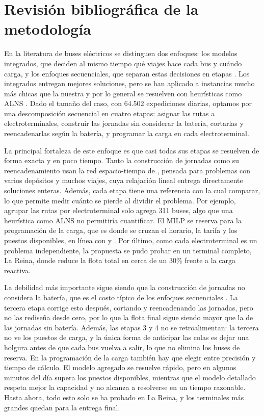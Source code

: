 \section{Revisión bibliográfica de la metodología}
 
En la literatura de buses eléctricos se distinguen dos enfoques: los modelos integrados, que deciden al mismo tiempo qué viajes hace cada bus y cuándo carga, y los enfoques secuenciales, que separan estas decisiones en etapas \cite{perumal2022}. Los integrados entregan mejores soluciones, pero se han aplicado a instancias mucho más chicas que la nuestra y por lo general se resuelven con heurísticas como ALNS \cite{wen2016, wang2024}. Dado el tamaño del caso, con 64.502 expediciones diarias, optamos por una descomposición secuencial en cuatro etapas: asignar las rutas a electroterminales, construir las jornadas sin considerar la batería, cortarlas y reencadenarlas según la batería, y programar la carga en cada electroterminal.

La principal fortaleza de este enfoque es que casi todas sus etapas se resuelven de forma exacta y en poco tiempo. Tanto la construcción de jornadas como su reencadenamiento usan la red espacio-tiempo de , pensada para problemas con varios depósitos y muchos viajes, cuya relajación lineal entrega directamente soluciones enteras. Además, cada etapa tiene una referencia con la cual comparar, lo que permite medir cuánto se pierde al dividir el problema. Por ejemplo, agrupar las rutas por electroterminal solo agrega 311 buses, algo que una heurística como ALNS no permitiría cuantificar. El MILP se reserva para la programación de la carga, que es donde se cruzan el horario, la tarifa y los puestos disponibles, en línea con  y . Por último, como cada electroterminal es un problema independiente, la propuesta se pudo probar en un terminal completo, La Reina, donde reduce la flota total en cerca de un 30\% frente a la carga reactiva.
 
La debilidad más importante sigue siendo que la construcción de jornadas no considera la batería, que es el costo típico de los enfoques secuenciales \cite{perumal2022}. La tercera etapa corrige esto después, cortando y reencadenando las jornadas, pero no las rediseña desde cero, por lo que la flota final sigue siendo mayor que la de las jornadas sin batería. Además, las etapas 3 y 4 no se retroalimentan: la tercera no ve los puestos de carga, y la única forma de anticipar las colas es dejar una holgura antes de que cada bus vuelva a salir, lo que no elimina los buses de reserva. En la programación de la carga también hay que elegir entre precisión y tiempo de cálculo. El modelo agregado se resuelve rápido, pero en algunos minutos del día supera los puestos disponibles, mientras que el modelo detallado respeta mejor la capacidad y no alcanza a resolverse en un tiempo razonable. Hasta ahora, todo esto solo se ha probado en La Reina, y los terminales más grandes quedan para la entrega final.
 
